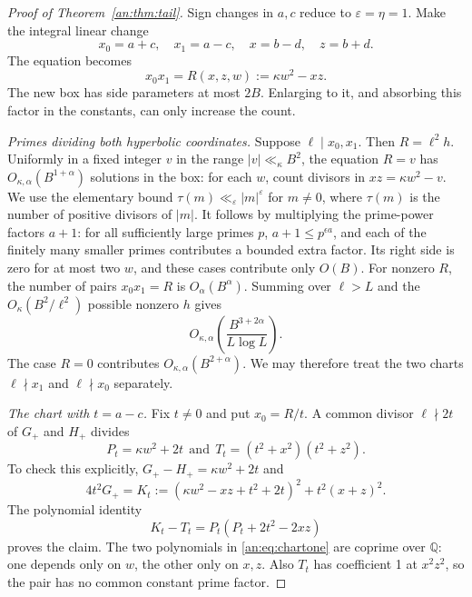 \documentclass[11pt,reqno]{amsart}
\theoremstyle{definition}
\numberwithin{equation}{section}
\newcommand{\eps}{\varepsilon}
\newcommand{\Q}{\mathbb Q}
\def\t{\text}
\begin{document}
\begin{proof}[Proof of Theorem~\ref{an:thm:tail}]
Sign changes in $a,c$ reduce to $\eps=\eta=1$. Make the integral linear change
\[
 x_0=a+c,\quad x_1=a-c,\quad x=b-d,\quad z=b+d.
\]
The equation becomes
\begin{equation}\label{an:eq:hyperbolic}
 x_0x_1=R(x,z,w):=\kappa w^2-xz.
\end{equation}
The new box has side parameters at most $2B$. Enlarging to it, and absorbing this factor in the constants, can only increase the count.

\smallskip\noindent
\emph{Primes dividing both hyperbolic coordinates.}
Suppose $\ell\mid x_0,x_1$. Then $R=\ell^2h$. Uniformly in a fixed integer $v$ in the range $|v|\ll_\kappa B^2$, the equation $R=v$ has $O_{\kappa,\alpha}(B^{1+\alpha})$ solutions in the box: for each $w$, count divisors in $xz=\kappa w^2-v$. We use the elementary bound $\tau(m)\ll_\varepsilon |m|^\varepsilon$ for $m\ne0$, where $\tau(m)$ is the number of positive divisors of $|m|$. It follows by multiplying the prime-power factors $a+1$: for all sufficiently large primes $p$, $a+1\le p^{\epsilon a}$, and each of the finitely many smaller primes contributes a bounded extra factor. Its right side is zero for at most two $w$, and these cases contribute only $O(B)$. For nonzero $R$, the number of pairs $x_0x_1=R$ is $O_\alpha(B^\alpha)$. Summing over $\ell>L$ and the $O_\kappa(B^2/\ell^2)$ possible nonzero $h$ gives
\[
 O_{\kappa,\alpha}\left(\frac{B^{3+2\alpha}}{L\log L}\right).
\]
The case $R=0$ contributes $O_{\kappa,\alpha}(B^{2+\alpha})$. We may therefore treat the two charts $\ell\nmid x_1$ and $\ell\nmid x_0$ separately.

\smallskip\noindent
\emph{The chart with $t=a-c$.}
Fix $t\ne0$ and put $x_0=R/t$. A common divisor $\ell\nmid2t$ of $G_+$ and $H_+$ divides
\begin{equation}\label{an:eq:chartone}
 P_t=\kappa w^2+2t\ \ \t{and}\ \ T_t=(t^2+x^2)(t^2+z^2).
\end{equation}
To check this explicitly, $G_+-H_+=\kappa w^2+2t$ and
\[
 4t^2G_+=K_t:=(\kappa w^2-xz+t^2+2t)^2+t^2(x+z)^2.
\]
The polynomial identity
\begin{equation}\label{an:eq:identity}
 K_t-T_t=P_t(P_t+2t^2-2xz)
\end{equation}
proves the claim. The two polynomials in \eqref{an:eq:chartone} are coprime over $\Q$: one depends only on $w$, the other only on $x,z$. Also $T_t$ has coefficient 1 at $x^2z^2$, so the pair has no common constant prime factor.


\end{proof}
\end{document}

